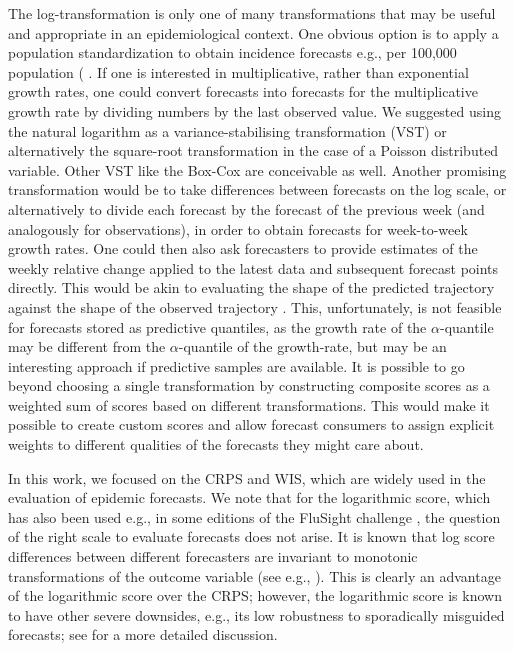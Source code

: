 \documentclass{article}
\begin{document}
The log-transformation is only one of many transformations that may be useful and appropriate in an epidemiological context. One obvious option is to apply a population standardization to obtain incidence forecasts e.g., per 100,000 population ( \citep{abbottEvaluatingEpidemiologicallyMotivated2022}. If one is interested in multiplicative, rather than exponential growth rates, one could convert forecasts into forecasts for the multiplicative growth rate by dividing numbers by the last observed value. We suggested using the natural logarithm as a variance-stabilising transformation (VST) or alternatively the square-root transformation in the case of a Poisson distributed variable. Other VST like the Box-Cox \citep{boxAnalysisTransformations1964} are conceivable as well. Another promising transformation would be to take differences between forecasts on the log scale, or alternatively to divide each forecast by the forecast of the previous week (and analogously for observations), in order to obtain forecasts for week-to-week growth rates. One could then also ask forecasters to provide estimates of the weekly relative change applied to the latest data and subsequent forecast points directly. This would be akin to evaluating the shape of the predicted trajectory against the shape of the observed trajectory \citep[for a different approach to evaluating the shape of a forecast, see][]{srivastavaShapebasedEvaluationEpidemic2022}. This, unfortunately, is not feasible for forecasts stored as predictive quantiles, as the growth rate of the $\alpha$-quantile may be different from the $\alpha$-quantile of the growth-rate, but may be an interesting approach if predictive samples are available. It is possible to go beyond choosing a single transformation by constructing composite scores as a weighted sum of scores based on different transformations. This would make it possible to create custom scores and allow forecast consumers to assign explicit weights to different qualities of the forecasts they might care about.

In this work, we focused on the CRPS and WIS, which are widely used in the evaluation of epidemic forecasts. We note that for the logarithmic score, which has also been used e.g., in some editions of the FluSight challenge \cite{reichCollaborativeMultiyearMultimodel2019}, the question of the right scale to evaluate forecasts does not arise. It is known that log score differences between different forecasters are invariant to monotonic transformations of the outcome variable (see e.g., \citealt{diksLikelihoodbasedScoringRules2011}). This is clearly an advantage of the logarithmic score over the CRPS; however, the logarithmic score is known to have other severe downsides, e.g., its low robustness to sporadically misguided forecasts; see \cite{bracherEvaluatingEpidemicForecasts2021} for a more detailed discussion.
\end{document}
